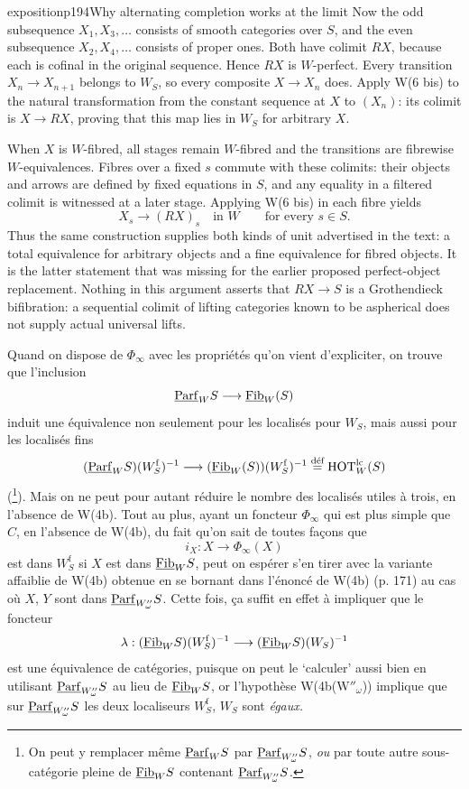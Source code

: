 \begin{dcomment}{exposition}{p194}{Why alternating completion works at the limit}
Now the odd subsequence $X_1,X_3,\ldots$ consists of smooth categories over $S$, and the even subsequence $X_2,X_4,\ldots$ consists of proper ones. Both have colimit $RX$, because each is cofinal in the original sequence. Hence $RX$ is $W$-perfect. Every transition $X_n\to X_{n+1}$ belongs to $W_S$, so every composite $X\to X_n$ does. Apply W(6 bis) to the natural transformation from the constant sequence at $X$ to $(X_n)$: its colimit is $X\to RX$, proving that this map lies in $W_S$ for arbitrary $X$.

When $X$ is $W$-fibred, all stages remain $W$-fibred and the transitions are fibrewise $W$-equivalences. Fibres over a fixed $s$ commute with these colimits: their objects and arrows are defined by fixed equations in $S$, and any equality in a filtered colimit is witnessed at a later stage. Applying W(6 bis) in each fibre yields
\[
 X_s\longrightarrow (RX)_s\quad\text{in }W
 \qquad\text{for every }s\in S.
\]
Thus the same construction supplies both kinds of unit advertised in the text: a total equivalence for arbitrary objects and a fine equivalence for fibred objects. It is the latter statement that was missing for the earlier proposed perfect-object replacement. Nothing in this argument asserts that $RX\to S$ is a Grothendieck bifibration: a sequential colimit of lifting categories known to be aspherical does not supply actual universal lifts.
\end{dcomment}


Quand on dispose de $\Phi_\infty$ avec les propriétés qu'on vient d'expliciter, on trouve que l'inclusion
\[
\underline{\mathrm{Parf}}_W S \longrightarrow \underline{\mathrm{Fib}}_W(S)
\]
induit une équivalence non seulement pour les localisés pour $W_S$, mais aussi pour les localisés fins
\[
(\underline{\mathrm{Parf}}_W S)(W_S^{\mathrm{f}})^{-1} \longrightarrow (\underline{\mathrm{Fib}}_W(S))(W_S^{\mathrm{f}})^{-1} \overset{\text{déf}}{=} \mathrm{HOT}^{\mathrm{lc}}_W(S)
\]
(\footnote[94]{On peut y remplacer même $\underline{\mathrm{Parf}}_W S$ par $\underline{\mathrm{Parf}}_{W''_\omega} S$, \textit{ou} par toute autre sous-catégorie pleine de $\underline{\mathrm{Fib}}_W S$ contenant $\underline{\mathrm{Parf}}_{W''_\omega} S$.}). Mais on ne peut pour autant réduire le nombre des localisés utiles à trois, en l'absence de W(4b). Tout au plus, ayant un foncteur $\Phi_\infty$ qui est plus simple que $C$, en l'absence de W(4b), du fait qu'on sait de toutes façons que
\[
i_X : X \longrightarrow \Phi_\infty(X)
\]
est dans $W_S^{\mathrm{f}}$ si $X$ est dans $\underline{\mathrm{Fib}}_W S$, peut on
espérer s'en tirer avec la variante affaiblie de W(4b) obtenue en se bornant dans l'énoncé de W(4b) (p. 171) au cas où $X$, $Y$ sont dans $\underline{\mathrm{Parf}}_{W''_\omega} S$. Cette fois, ça suffit en effet à impliquer que le foncteur
\[
\lambda : (\underline{\mathrm{Fib}}_W S)(W_S^{\mathrm{f}})^{-1} \longrightarrow (\underline{\mathrm{Fib}}_W S)(W_S)^{-1}
\]
est une équivalence de catégories, puisque on peut le ‘calculer’ aussi bien en utilisant $\underline{\mathrm{Parf}}_{W''_\omega} S$ au lieu de $\underline{\mathrm{Fib}}_W S$, or l'hypothèse W(4b($\mathrm{W}''_\omega$)) implique que sur $\underline{\mathrm{Parf}}_{W''_\omega} S$ les deux localiseurs $W_S^{\mathrm{f}}$, $W_S$ sont \textit{égaux.}


